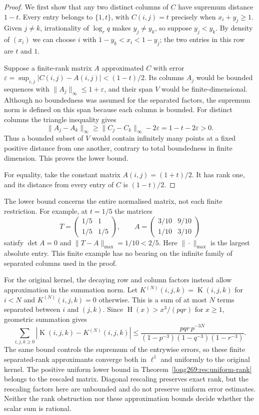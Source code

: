\documentclass[11pt]{article}
\theoremstyle{remark}
\theoremstyle{plain}
\newcommand{\hgt}{\operatorname{H}}
\newcommand{\Kernel}{\operatorname{K}}
\begin{document}
\begin{proof}
We first show that any two distinct columns of $C$ have supremum distance
$1-t$. Every entry belongs to $\{1,t\}$, with $C(i,j)=t$ precisely when
$x_i+y_j\ge1$. Given $j\ne k$, irrationality of $\log_r q$ makes
$y_j\ne y_k$, so suppose $y_j<y_k$. By density of $(x_i)$ we can choose
$i$ with $1-y_k<x_i<1-y_j$; the two entries in this row are $t$ and $1$.

Suppose a finite-rank matrix $A$ approximated $C$ with error
$\varepsilon=\sup_{i,j}|C(i,j)-A(i,j)|<(1-t)/2$. Its columns $A_j$ would
be bounded sequences with $\|A_j\|_\infty\le1+\varepsilon$, and their
span $V$ would be finite-dimensional. Although no boundedness was assumed
for the separated factors, the supremum norm is defined on this span
because each column is bounded. For distinct columns the triangle
inequality gives
\[
 \|A_j-A_k\|_\infty\ge\|C_j-C_k\|_\infty-2\varepsilon
 =1-t-2\varepsilon>0.
\]
Thus a bounded subset of $V$ would contain infinitely many points at a
fixed positive distance from one another, contrary to total boundedness
in finite dimension. This proves the lower bound.

For equality, take the constant matrix $A(i,j)=(1+t)/2$. It has rank one,
and its distance from every entry of $C$ is $(1-t)/2$.
\end{proof}

The lower bound concerns the entire normalised matrix, not each finite
restriction.  For example, at $t=1/5$ the matrices
\[
 T=\begin{pmatrix}1/5&1\\1/5&1/5\end{pmatrix},\qquad
 A=\begin{pmatrix}3/10&9/10\\1/10&3/10\end{pmatrix}
\]
satisfy $\det A=0$ and $\|T-A\|_{\max}=1/10<2/5$.
Here $\|\cdot\|_{\max}$ is the largest absolute entry.  This finite
example has no bearing on the infinite family of separated columns used
in the proof.

For the original kernel, the decaying row and column factors instead
allow approximation in the summation norm.  Let $K^{(N)}(i,j,k)=\Kernel(i,j,k)$ for $i<N$ and
$K^{(N)}(i,j,k)=0$ otherwise.  This is a sum of at most $N$ terms separated
between $i$ and $(j,k)$.  Since
$\hgt(x)>x^3/(pqr)$ for $x\ge1$, geometric summation gives
\begin{equation}\label{long269:eq:l1-finite-rank-approximation}
 \sum_{i,j,k\ge0}|\Kernel(i,j,k)-K^{(N)}(i,j,k)|
 \le
 \frac{pqr\,p^{-3N}}
 {(1-p^{-3})(1-q^{-3})(1-r^{-3})}.
\end{equation}
The same bound controls the supremum of the entrywise errors, so these
finite separated-rank approximants converge both in $\ell^1$ and uniformly
to the original kernel.  The positive uniform lower bound in
Theorem~\ref{long269:res:uniform-rank} belongs to the rescaled matrix.
Diagonal rescaling preserves exact rank, but the rescaling factors here
are unbounded and do not preserve uniform error estimates.  Neither the
rank obstruction nor these approximation bounds decide whether the scalar
sum is rational.
\end{document}

